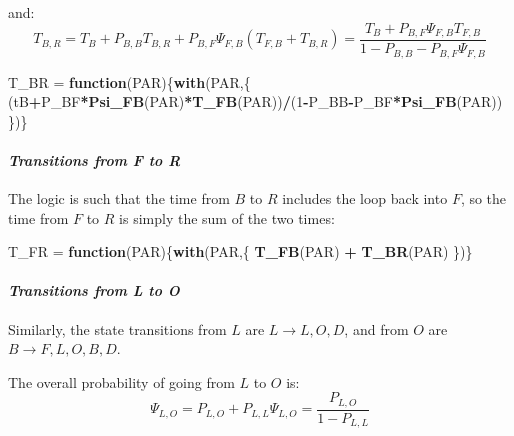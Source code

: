 \documentclass[]{article}
\newenvironment{Shaded}{\begin{snugshade}}{\end{snugshade}}
\newcommand{\ControlFlowTok}[1]{\textcolor[rgb]{0.13,0.29,0.53}{\textbf{#1}}}
\newcommand{\DecValTok}[1]{\textcolor[rgb]{0.00,0.00,0.81}{#1}}
\newcommand{\KeywordTok}[1]{\textcolor[rgb]{0.13,0.29,0.53}{\textbf{#1}}}
\newcommand{\NormalTok}[1]{#1}
\newcommand{\OperatorTok}[1]{\textcolor[rgb]{0.81,0.36,0.00}{\textbf{#1}}}
\newcommand{\StringTok}[1]{\textcolor[rgb]{0.31,0.60,0.02}{#1}}
\let\oldparagraph\paragraph
\renewcommand{\paragraph}[1]{\oldparagraph{#1}\mbox{}}
\begin{document}
and: \[
T_{B,R} = T_B + P_{B,B} T_{B,R} + P_{B,F} \Psi_{F,B} \left(T_{F,B} +  T_{B,R} \right) =  \frac{T_B +  P_{B,F} \Psi_{F,B} T_{F,B}}{1-P_{B,B} - P_{B,F} \Psi_{F,B}}
\]

\begin{Shaded}
\begin{Highlighting}[]
\NormalTok{T_BR =}\StringTok{ }\ControlFlowTok{function}\NormalTok{(PAR)\{}\KeywordTok{with}\NormalTok{(PAR,\{}
\NormalTok{  (tB}\OperatorTok{+}\NormalTok{P_BF}\OperatorTok{*}\KeywordTok{Psi_FB}\NormalTok{(PAR)}\OperatorTok{*}\KeywordTok{T_FB}\NormalTok{(PAR))}\OperatorTok{/}\NormalTok{(}\DecValTok{1}\OperatorTok{-}\NormalTok{P_BB}\OperatorTok{-}\NormalTok{P_BF}\OperatorTok{*}\KeywordTok{Psi_FB}\NormalTok{(PAR))}
\NormalTok{\})\}}
\end{Highlighting}
\end{Shaded}

\hypertarget{transitions-from-f-to-r}{%
\paragraph{\texorpdfstring{\emph{Transitions from F to
R}}{Transitions from F to R}}\label{transitions-from-f-to-r}}

The logic is such that the time from \(B\) to \(R\) includes the loop
back into \(F\), so the time from \(F\) to \(R\) is simply the sum of
the two times:

\begin{Shaded}
\begin{Highlighting}[]
\NormalTok{T_FR =}\StringTok{ }\ControlFlowTok{function}\NormalTok{(PAR)\{}\KeywordTok{with}\NormalTok{(PAR,\{}
  \KeywordTok{T_FB}\NormalTok{(PAR) }\OperatorTok{+}\StringTok{ }\KeywordTok{T_BR}\NormalTok{(PAR)}
\NormalTok{\})\}}
\end{Highlighting}
\end{Shaded}

\hypertarget{transitions-from-l-to-o}{%
\paragraph{\texorpdfstring{\emph{Transitions from L to
O}}{Transitions from L to O}}\label{transitions-from-l-to-o}}

Similarly, the state transitions from \(L\) are
\(L \rightarrow {L,O,D}\), and from \(O\) are
\(B\rightarrow {F,L,O,B,D}\).

The overall probability of going from \(L\) to \(O\) is: \[
\Psi_{L,O}= P_{L,O} + P_{L,L} \Psi_{L,O} = \frac{P_{L,O}}{1-P_{L,L}}
\]
\end{document}
